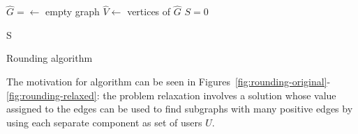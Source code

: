 \begin{algorithm}
	\SetAlgoLined
	$\hat{G} = \leftarrow $ empty graph \;
	$\hat{V} \leftarrow $ vertices of $\hat{G}$ \;
	$S = 0$


	\Return S \;
	\caption{Rounding algorithm}
	\label{alg:algorithm_rounding}
\end{algorithm}

The motivation for algorithm can be seen in
Figures~\ref{fig:rounding-original}-\ref{fig:rounding-relaxed}: the problem
relaxation involves a solution whose value assigned to the edges can be used to
find subgraphs with many positive edges by using each separate component as set
of users $U$.

